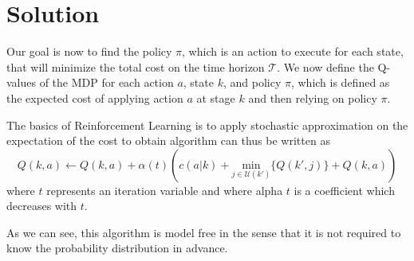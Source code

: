 \section{Solution}
\label{sec:solution}

Our goal is now to find the policy $\pi$, which is an action to execute for each state, that will minimize the total cost on the time horizon $\mathcal{T}$.
We now define the Q-values of the MDP for each action $a$, state $k$, and policy $\pi$, which is defined as the expected cost of applying action $a$ at stage $k$ and then relying on policy $\pi$.

The basics of Reinforcement Learning is to apply stochastic approximation on the expectation of the cost to obtain algorithm can thus be written as
\[
  Q(k,a) \leftarrow Q(k,a) + \alpha(t) \left( c(a|k) + \underset{j\in \mathcal{U}(k')}{\text{min}} \{Q(k',j)\} + Q(k,a) \right)
\]
where $t$ represents an iteration variable and where alpha $t$ is a coefficient which decreases with $t$.

As we can see, this algorithm is model free in the sense that it is not required to know the probability distribution in advance.
